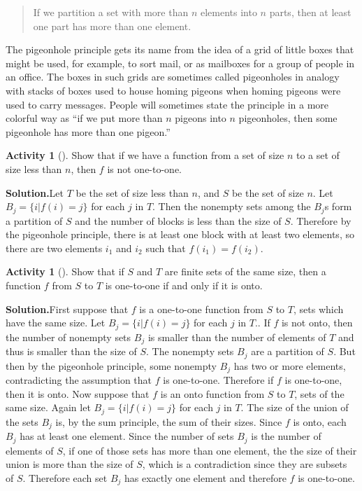 \documentclass[10pt,]{book}
\theoremstyle{plain}
\theoremstyle{definition}
\newtheorem{activity}[project]{Activity}
\numberwithin{equation}{chapter}
\begin{document}
\begin{quote}If we partition a set with more than \(n\) elements into \(n\) parts, then at least one part has more than one element.%
\end{quote}
The pigeonhole principle gets its name from the idea of a grid of little boxes that might be used, for example, to sort mail, or as mailboxes for a group of people in an office. The boxes in such grids are sometimes called pigeonholes in analogy with stacks of boxes used to house homing pigeons when homing pigeons were used to carry messages. People will sometimes state the principle in a more colorful way as ``if we put more than \(n\) pigeons into \(n\) pigeonholes, then some pigeonhole has more than one pigeon.''%
\begin{activity}[]\label{activity-15}
Show that if we have a function from a set of size \(n\) to a set of size less than \(n\), then \(f\) is not one-to-one.%
\par\medskip\noindent%
\textbf{Solution.}\quad Let \(T\) be the set of size less than \(n\), and \(S\) be the set of size \(n\). Let \(B_j=\{i|f(i)=j\}\) for each \(j\) in \(T\). Then the nonempty sets among the \(B_j\)s form a partition of \(S\) and the number of blocks is less than the size of \(S\). Therefore by the pigeonhole principle, there is at least one block with at least two elements, so there are two elements \(i_1\) and \(i_2\) such that \(f(i_1)=f(i_2)\).%
\end{activity}
\begin{activity}[]\label{activity-16}
Show that if \(S\) and \(T\) are finite sets of the same size, then a function \(f\) from \(S\) to \(T\) is one-to-one if and only if it is onto.%
\par\medskip\noindent%
\textbf{Solution.}\quad First suppose that \(f\) is a one-to-one function from \(S\) to \(T\), sets which have the same size. Let \(B_j=\{i|f(i)=j\}\) for each \(j\) in \(T\)..  If \(f\) is not onto, then the number of nonempty sets \(B_j\) is smaller than the number of elements of \(T\) and thus is smaller than the size of \(S\). The nonempty sets \(B_j\) are a partition of \(S\). But then by the pigeonhole principle, some nonempty \(B_j\) has two or more elements, contradicting the assumption that \(f\) is one-to-one. Therefore if \(f\) is one-to-one, then it is onto. Now suppose that \(f\) is an onto function from \(S\) to \(T\), sets of the same size. Again let \(B_j =\{i|f(i)=j\}\) for each \(j\) in \(T\). The size of the union of the sets \(B_j\) is, by the sum principle, the sum of their sizes. Since \(f\) is onto, each \(B_j\) has at least one element. Since the number of sets \(B_j\) is the number of elements of \(S\), if one of those sets has more than one element, the the size of their union is more than the size of \(S\), which is a contradiction since they are subsets of \(S\). Therefore each set \(B_j\) has exactly one element and therefore \(f\) is one-to-one.%
\end{activity}
\end{document}
